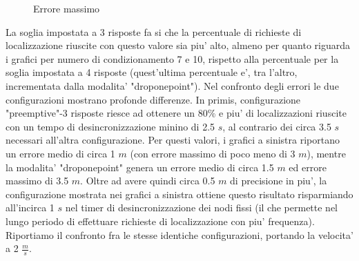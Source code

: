 \begin{figure}[H]
    \centering
    \hfill
    \caption{Errore massimo}
\end{figure}
La soglia impostata a 3 risposte fa si che la percentuale di richieste di localizzazione riuscite con questo valore sia piu' alto, almeno per quanto riguarda i grafici per numero di condizionamento 7 e 10, rispetto alla percentuale per la soglia impostata a 4 risposte (quest'ultima percentuale e', tra l'altro, incrementata dalla modalita' "droponepoint").
Nel confronto degli errori le due configurazioni mostrano profonde differenze. In primis, configurazione "preemptive"-3 risposte riesce ad ottenere un 80\% e piu' di localizzazioni riuscite con un tempo di desincronizzazione minino di 2.5 $s$, al contrario dei circa 3.5 $s$ necessari all'altra configurazione. Per questi valori, i grafici a sinistra riportano un errore medio di circa 1 $m$ (con errore massimo di poco meno di 3 $m$), mentre la modalita' "droponepoint" genera un errore medio di circa 1.5 $m$ ed errore massimo di 3.5 $m$.
Oltre ad avere quindi circa 0.5 $m$ di precisione in piu', la configurazione mostrata nei grafici a sinistra ottiene questo risultato risparmiando all'incirca 1 $s$ nel timer di desincronizzazione dei nodi fissi (il che permette nel lungo periodo di effettuare richieste di localizzazione con piu' frequenza).
Riportiamo il confronto fra le stesse identiche configurazioni, portando la velocita' a 2 $\frac{m}{s}$.

